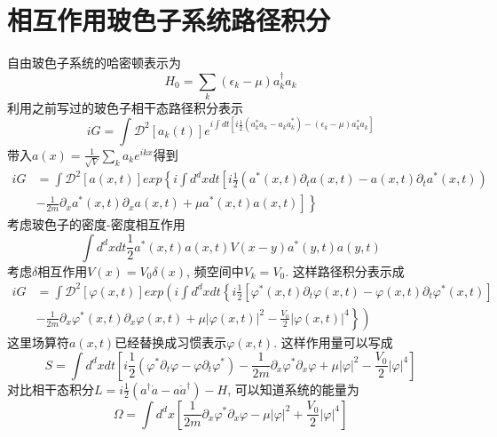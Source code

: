 \documentclass[a4paper,11pt]{article}
\begin{document}
\section{相互作用玻色子系统路径积分}
自由玻色子系统的哈密顿表示为
\begin{equation*}
  H_0=\sum_{k}(\epsilon_k-\mu)a_k^\dag a_k
\end{equation*}
利用之前写过的玻色子相干态路径积分表示
\begin{equation*}
  iG=\int \mathcal{D}^2[a_k(t)]e^{i\int dt[i\frac{1}{2}(a_k^*\dot{a}_k-a_k\dot{a}_k^*)-(\epsilon_k-\mu)a_k^*a_k]}
\end{equation*}
带入$a(x)=\frac{1}{\sqrt{V}}\sum_{k}a_ke^{ikx}$得到
\begin{equation*}
  \begin{split}
     iG&=\int\mathcal{D}^2[a(x,t)]exp\left\{i\int d^dxdt\left[i\frac{1}{2}(a^*(x,t)\partial_t a(x,t)-a(x,t)\partial_t a^*(x,t))\right.\right.\\
  &\left.\left.-\frac{1}{2m}\partial_xa^*(x,t)\partial_xa(x,t)+\mu a^*(x,t)a(x,t)\right]\right\}
  \end{split}
\end{equation*}
考虑玻色子的密度-密度相互作用
\begin{equation*}
  \int d^dx dt\frac{1}{2}a^*(x,t)a(x,t)V(x-y)a^*(y,t)a(y,t)
\end{equation*}
考虑$\delta$相互作用$V(x)=V_0\delta(x)$, 频空间中$V_k=V_0$. 这样路径积分表示成
\begin{equation*}
  \begin{split}
     iG&=\int \mathcal{D}^2[\varphi(x,t)]exp\left(i\int d^dxdt\left\{i\frac{1}{2}[\varphi^*(x,t)\partial_t\varphi(x,t)-\varphi(x,t)\partial_t\varphi^*(x,t)]\right.\right.\\
  &\left.\left.-\frac{1}{2m}\partial_x\varphi^*(x,t)\partial_x\varphi(x,t)+\mu|\varphi(x,t)|^2-\frac{V_0}{2}|\varphi(x,t)|^4\right\}\right)
  \end{split}
\end{equation*}
这里场算符$a(x,t)$已经替换成习惯表示$\varphi(x,t)$. 这样作用量可以写成
\begin{equation*}
  S=\int d^dx dt\left[i\frac{1}{2}(\varphi^*\partial_t\varphi-\varphi\partial_t\varphi^*)-\frac{1}{2m}\partial_x\varphi^*\partial_x\varphi+\mu|\varphi|^2-\frac{V_0}{2}|\varphi|^4\right]
\end{equation*}
对比相干态积分$L=i\frac{1}{2}(a^\dag \dot{a}-a\dot{a}^\dag)-H$, 可以知道系统的能量为
\begin{equation*}
  \Omega=\int d^dx\left[\frac{1}{2m}\partial_x\varphi^*\partial_x\varphi-\mu|\varphi|^2+\frac{V_0}{2}|\varphi|^4\right]
\end{equation*}
\end{document}
